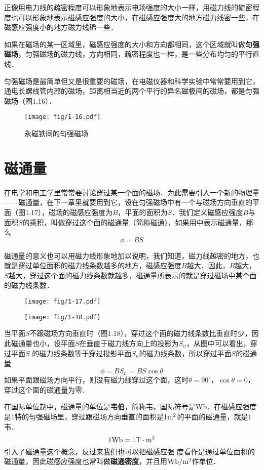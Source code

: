 正像用电力线的疏密程度可以形象地表示电场强度的大小一样，用磁力线的硫密程度也可以形象地表示磁感应强度的大小，在磁感应强度大的地方磁力线密一些，在磁感应强度小的地方磁力线稀一些．

如果在磁场的某一区域里，磁感应强度的大小和方向都相同，这个区域就叫做\textbf{匀强磁场}，匀强磁场的磁力线，方向相同，疏密程度也一样，是一些分布均匀的平行直线．

匀强磁场是最简单但又是很重要的磁场，在电磁仪器和科学实验中常常要用到它，通电长螺线管内部的磁场，距离相当近的两个平行的异名磁极间的磁场，都是匀强磁场（图1.16）．

\begin{figure}[htp]\centering
\texttt{[image: fig/1-16.pdf]}
\caption{永磁铁间的匀强磁场}
\end{figure}

\section{磁通量}
在电学和电工学里常常要讨论穿过某一个面的磁场．为此需要引入一个新的物理量——磁通量，在下一章里就要用到它，设在匀强磁场中有一个与磁场方向垂直的平面（图1.17），磁场的磁感应强度为$B$，平面的面积为$S$．我们定义磁感应强度$B$与面积$S$的乘积，叫做穿过这个面的磁通量（简称磁通），如果用中表示磁通量，那么
\[\phi=BS \]

磁通量的意义也可以用磁力线形象地加以说明，我们知道，磁力线越密的地方，也就是穿过单位面积的磁力线条数越多的地方，磁感应强度$B$越大．因此，$B$越大，$S$越大，穿过这个面的磁力线条数就越多，磁通量所表示的就是穿过磁场中某个面的磁力线条数．

\begin{figure}[htp]
\centering
\begin{minipage}[t]{0.48\textwidth}
\centering
\texttt{[image: fig/1-17.pdf]}
\caption{}
\end{minipage}
\begin{minipage}[t]{0.48\textwidth}
\centering
\texttt{[image: fig/1-18.pdf]}
\caption{}
\end{minipage}
\end{figure}


当平面$S$不跟磁场方向垂直时（图1.18），穿过这个面的磁力线条数比垂直时少，因此磁通量也小，设平面$S$在垂直于磁力线方向上的投影为$S_n$，从图中可以看出，穿过平面$S$
的磁力线条数等于穿过投影平面$S_n$的磁力线条数，所以穿过平面$S$的磁通量
\[\phi=BS_n=BS\cos\theta\]
如果平面跟磁场方向平行，则没有磁力线穿过这个面，这时$\theta=90^\circ$，$\cos\theta=0$，穿过这个面的磁通量为零．

在国际单位制中，磁通量的单位是\textbf{韦伯}，简称韦，国际符号是Wb．在磁感应强度是1特的匀强磁场里，穿过跟磁场方向垂直的面积是1${\rm m^2}$的平面的磁通量，就是1韦．
\[1{\rm Wb}=1{\rm T\cdot m^2}\]
引入了磁通量这个概念，反过来我们也可以把磁感应强
度看作是通过单位面积的磁通量，因此磁感应强度也常叫做\textbf{磁通密度}，并且用${\rm Wb}/{\rm m^2}$作单位．


